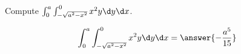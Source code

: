 \documentclass{ximera}
\author{David Guichard \and Neal Koblitz \and H. Jerome Keisler \and Albert Scheller \and Barry Balof \and Mike Wills \and Matthew Carr}
\begin{document}
\begin{exercise}





Compute $\int_{0}^{a}\int_{-\sqrt{a^2-x^2}}^{0}x^2 y\d y\d x$.
\begin{prompt}
\[
\int_{0}^{a}\int_{-\sqrt{a^2-x^2}}^{0}x^2 y\d y\d x=\answer{-\frac{a^5}{15}}
\]
\end{prompt}



\end{exercise}
\end{document}
